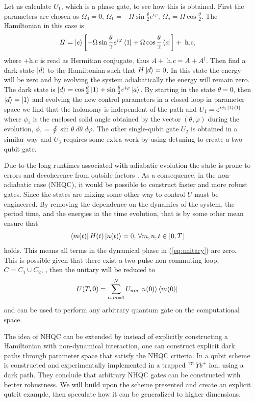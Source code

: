 Let us calculate $U_1$, which is a phase gate, to see how this is obtained. First the parameters are chosen as $\Omega_0 = 0,\,\Omega_1 = -\Omega\sin\frac{\theta}{2}e^{i\varphi},\, \Omega_a = \Omega\cos\frac{\theta}{2}$. The Hamiltonian in this case is 
\begin{equation}
H  = \ket{e}\left[-\Omega\sin\frac{\theta}{2}e^{i\varphi}\bra{1} + \Omega\cos\frac{\theta}{2}\bra{a}\right] + \;\text{h.c},
\end{equation}
where +\;h.c is read as Hermitian conjugate, thus $A +\;\text{h.c} = A + A^\dagger$. Then find a dark state $\ket{d}$ to the Hamiltonian such that $H\ket{d} = 0$. In this state the energy will be zero and by evolving the system adiabatically the energy will remain zero. The dark state is $\ket{d} = \cos\frac{\theta}{2}\ket{1} + \sin\frac{\theta}{2}e^{i\varphi}\ket{a}$. By starting in the state $\theta = 0$, then $\ket{d} = \ket{1}$ and evolving the new control parameters in a closed loop in parameter space we find that the holonomy is independent of the path and $U_1 = e^{i\phi_1\ket{1}\bra{1}}$ where $\phi_1$ is the enclosed solid angle obtained by the vector $(\theta,\varphi)$ during the evolution, $\phi_1 = \oint \sin\theta\; d\theta \;d\varphi$. The other single-qubit gate $U_2$ is obtained in a similar way and $U_3$ requires some extra work by using detuning to create a two-qubit gate.



Due to the long runtimes associated with adiabatic evolution the state is prone to errors and decoherence from outside factors \cite{NHQC}. As a consequence, in the non-adiabatic case (NHQC), it would be possible to construct faster and more robust gates. Since the states are mixing some other way to control $U$ must be engineered. By removing the dependence on the dynamics of the system, the period time, and the energies in the time evolution, that is by some other mean ensure that 
\begin{equation}
\bra{m(t)}H(t)\ket{n(t)} = 0,\,\forall m,n, t\in[0,T]
\end{equation} 
holds. This means all terms in the dynamical phase in (\ref{eq:unitary}) are zero.
This is possible given that there exist a two-pulse non commuting loop, $C = C_1 \cup C_2$, \cite{NHQC,sLoop}, 
then the unitary will be reduced to 
\begin{equation}
U(T,0) = \sum_{n,m = 1}^{N} U_{nm}\ket{n(0)}\bra{m(0)}
\end{equation}
and can be used to perform any arbitrary quantum gate on the computational space.

The idea of NHQC can be extended by instead of explicitly constructing a Hamiltonian with non-dynamical interaction, one can construct explicit dark paths through parameter space that satisfy the NHQC criteria. In \cite{darkpath} a qubit scheme is constructed and experimentally implemented in a trapped $^{171}Yb^{+}$ ion, using a dark path. They conclude that arbitrary NHQC gates can be constructed with better robustness. We will build upon the scheme presented and create an explicit qutrit example, then speculate how it can be generalized to higher dimensions.

